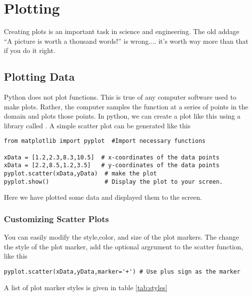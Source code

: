 \chapter{Plotting}
\label{chap:Plotting}

Creating plots is an important task in science and engineering.  The
old addage ``A picture is worth a thousand words!'' is wrong.... it's
worth way more than that if you do it right.  
\section{Plotting Data}
Python does not plot functions.  This is true of any computer
software used to make plots.  Rather, the computer samples the
function at a series of points in the domain and plots those points.
In python, we can create a plot like this using a library called
.  A simple scatter plot can be generated like this

\begin{Verbatim} 
from matplotlib import pyplot  #Import necessary functions

xData = [1.2,2.3,8.3,10.5]  # x-coordinates of the data points
xData = [2.2,8.5,1.2,3.5]   # y-coordinates of the data points
pyplot.scatter(xData,yData)  # make the plot
pyplot.show()                # Display the plot to your screen.
\end{Verbatim} 
Here we have plotted some data and displayed them to the screen.
\subsection*{Customizing Scatter Plots}
You can easily modify the style,color, and size of the plot markers.
The change the style of the plot marker, add the optional
 argrument to the scatter function, like this
\begin{Verbatim} 
pyplot.scatter(xData,yData,marker='+') # Use plus sign as the marker  
\end{Verbatim} 
A list of plot marker styles is given in table \ref{tab:styles}


